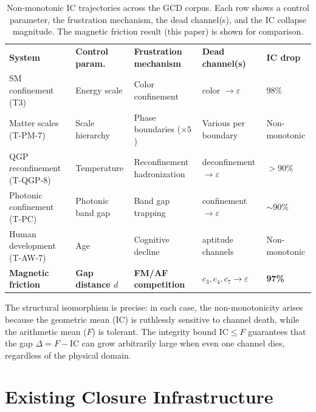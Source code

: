 \documentclass[
  aps,
  prd,
  twocolumn,
  superscriptaddress,
  nofootinbib,
  floatfix
]{revtex4-2}
\newcommand{\eps}{\varepsilon}
\newcommand{\IC}{\mathrm{IC}}
\begin{document}
\begin{table}[t]
\caption{\label{tab:cross}
  Non-monotonic $\IC$ trajectories across the GCD corpus.
  Each row shows a control parameter, the frustration
  mechanism, the dead channel(s), and the IC collapse
  magnitude.  The magnetic friction result (this paper)
  is shown for comparison.}
\begin{ruledtabular}
\begin{tabular}{lllll}
  \textbf{System} & \textbf{Control param.}
  & \textbf{Frustration mechanism}
  & \textbf{Dead channel(s)}
  & \textbf{IC drop} \\
  \colrule
  SM confinement (T3) & Energy scale
  & Color confinement & color $\to \eps$
  & $98\%$ \\
  Matter scales (T-PM-7) & Scale hierarchy
  & Phase boundaries ($\times 5$) & Various per boundary
  & Non-monotonic \\
  QGP reconfinement (T-QGP-8) & Temperature
  & Reconfinement hadronization & deconfinement $\to \eps$
  & $>90\%$ \\
  Photonic confinement (T-PC) & Photonic band gap
  & Band gap trapping & confinement $\to \eps$
  & $\sim 90\%$ \\
  Human development (T-AW-7) & Age
  & Cognitive decline & aptitude channels
  & Non-monotonic \\
  \colrule
  \textcolor{FrustGold}{\textbf{Magnetic friction}}
  & \textcolor{FrustGold}{\textbf{Gap distance $d$}}
  & \textcolor{FrustGold}{\textbf{FM/AF competition}}
  & \textcolor{FrustGold}{$c_3, c_4, c_7 \to \eps$}
  & \textcolor{FrustGold}{\textbf{97\%}} \\
\end{tabular}
\end{ruledtabular}
\end{table}

The structural isomorphism is precise: in each case,
the non-monotonicity arises because the geometric mean
(IC) is ruthlessly sensitive to channel death, while
the arithmetic mean ($F$) is tolerant.  The integrity
bound $\IC \leq F$ guarantees that the gap
$\Delta = F - \IC$ can grow arbitrarily large when
even one channel dies, regardless of the physical domain.

\section{Existing Closure Infrastructure}\label{sec:closures}
\end{document}
